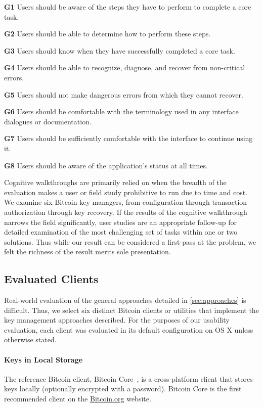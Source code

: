 	
\begin{compactlist}
	\item[\bf G1] Users should be aware of the steps they have to perform to complete a core task.
	\item[\bf G2] Users should be able to determine how to perform these steps.
	\item[\bf G3] Users should know when they have successfully completed a core task.
	\item[\bf G4] Users should be able to recognize, diagnose, and recover from non-critical errors.
	\item[\bf G5] Users should not make dangerous errors from which they cannot recover.
	\item[\bf G6] Users should be comfortable with the terminology used in any interface dialogues or documentation.
	\item[\bf G7] Users should be sufficiently comfortable with the interface to continue using it.
	\item[\bf G8] Users should be aware of the application's status at all times.
\end{compactlist}


Cognitive walkthroughs are primarily relied on when the breadth of the evaluation makes a user or field study prohibitive to run due to time and cost. We examine six Bitcoin key managers, from configuration through transaction authorization through key recovery. If the results of the cognitive walkthrough narrows the field significantly, user studies are an appropriate follow-up for detailed examination of the most challenging set of tasks within one or two solutions. Thus while our result can be considered a first-pass at the problem, we felt the richness of the result merits sole presentation.

\subsection{Evaluated Clients}
Real-world evaluation of the general approaches detailed in \autoref{sec:approaches} is difficult. Thus, we select six distinct Bitcoin clients or utilities that implement the key management approaches described. For the purposes of our usability evaluation, each client was evaluated in its default configuration on OS X unless otherwise stated. 

\paragraph{Keys in Local Storage} The reference Bitcoin client, Bitcoin Core~\cite{Bitcoinqt}, is a cross-platform client that stores keys locally (optionally encrypted with a password). Bitcoin Core is the first recommended client on the \url{Bitcoin.org} website. 

